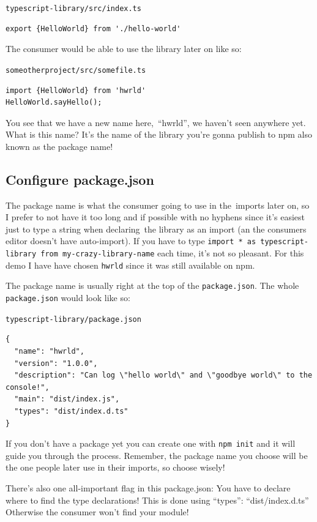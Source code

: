 \documentclass[12pt,a4paper]{article}
\newcommand{\filelabel}[1]{{\footnotesize\color{dkgreen}\texttt{#1}}{\vspace{-0.2cm}}}
\begin{document}
\filelabel{typescript-library/src/index.ts}
\begin{lstlisting}
export {HelloWorld} from './hello-world'
\end{lstlisting}

The consumer would be able to use the library later on like so:

\filelabel{someotherproject/src/somefile.ts}
\begin{lstlisting}
import {HelloWorld} from 'hwrld'
HelloWorld.sayHello();
\end{lstlisting}

You see that we have a new name here,~``hwrld'', we haven't seen
anywhere yet. What is this name? It's the name of the library you're
gonna publish to npm also known as the {package name}!

\subsection{\texorpdfstring{ Configure
package.json}{Configure package.json}}\label{step-4-configure-package.json}

The package name is what the consumer going to use in the~imports later
on, so I prefer to not have it too long and if possible with no hyphens
since it's easiest just to type a string when declaring~the library as
an import (an the consumers editor doesn't have auto-import). If you
have to type
\texttt{import\ *\ as\ typescript-library\ from\ \textquotesingle{}my-crazy-library-name\textquotesingle{}}
each time, it's not so pleasant. For this demo I have have chosen
\texttt{hwrld} since it was still available on npm.

The package name is usually right at the top of the
\texttt{package.json}. The whole
\texttt{package.json} would look like so:

\filelabel{typescript-library/package.json}
\begin{lstlisting}
{
  "name": "hwrld",
  "version": "1.0.0",
  "description": "Can log \"hello world\" and \"goodbye world\" to the console!",
  "main": "dist/index.js",
  "types": "dist/index.d.ts"
}
\end{lstlisting}

If you don't have a package yet you can create one with
\texttt{npm\ init} and it will guide you through the process. Remember,
the package name you choose will be the one people later use in their
imports, so choose wisely!

There's also one all-important flag in this package.json: You have to
declare where to find the type declarations! This is done using
{``types'': ``dist/index.d.ts''} Otherwise the consumer won't find your
module!
\end{document}

